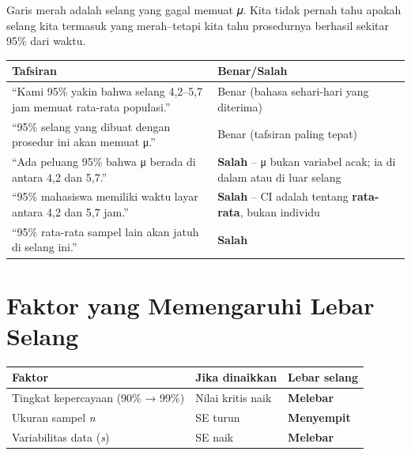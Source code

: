 \documentclass[
  indonesian,
  letterpaper,
]{book}
\newcounter{none} %
\begin{document}
Garis merah adalah selang yang gagal memuat 𝜇. Kita tidak pernah tahu
apakah selang kita termasuk yang merah--tetapi kita tahu prosedurnya
berhasil sekitar 95\% dari waktu.

{\def\LTcaptype{none} %
\begin{longtable}[]{@{}
  >{\raggedright\arraybackslash}p{}
  >{\raggedright\arraybackslash}p{}@{}}
\toprule\noalign{}
\begin{minipage}[b]{\linewidth}\raggedright
Tafsiran
\end{minipage} & \begin{minipage}[b]{\linewidth}\raggedright
Benar/Salah
\end{minipage} \\
\midrule\noalign{}
\endhead
\bottomrule\noalign{}
\endlastfoot
``Kami 95\% yakin bahwa selang 4,2--5,7 jam memuat rata-rata populasi.''
& Benar (bahasa sehari-hari yang diterima) \\
``95\% selang yang dibuat dengan prosedur ini akan memuat μ.'' & Benar
(tafsiran paling tepat) \\
``Ada peluang 95\% bahwa μ berada di antara 4,2 dan 5,7.'' &
\textbf{Salah} -- μ bukan variabel acak; ia di dalam atau di luar
selang \\
``95\% mahasiswa memiliki waktu layar antara 4,2 dan 5,7 jam.'' &
\textbf{Salah} -- CI adalah tentang \textbf{rata-rata}, bukan
individu \\
``95\% rata-rata sampel lain akan jatuh di selang ini.'' &
\textbf{Salah} \\
\end{longtable}
}

\section{Faktor yang Memengaruhi Lebar
Selang}\label{faktor-yang-memengaruhi-lebar-selang}

{\def\LTcaptype{none} %
\begin{longtable}[]{@{}lll@{}}
\toprule\noalign{}
Faktor & Jika dinaikkan & Lebar selang \\
\midrule\noalign{}
\endhead
\bottomrule\noalign{}
\endlastfoot
Tingkat kepercayaan (90\% → 99\%) & Nilai kritis naik &
\textbf{Melebar} \\
Ukuran sampel \emph{n} & SE turun & \textbf{Menyempit} \\
Variabilitas data (\emph{s}) & SE naik & \textbf{Melebar} \\
\end{longtable}
}
\end{document}
